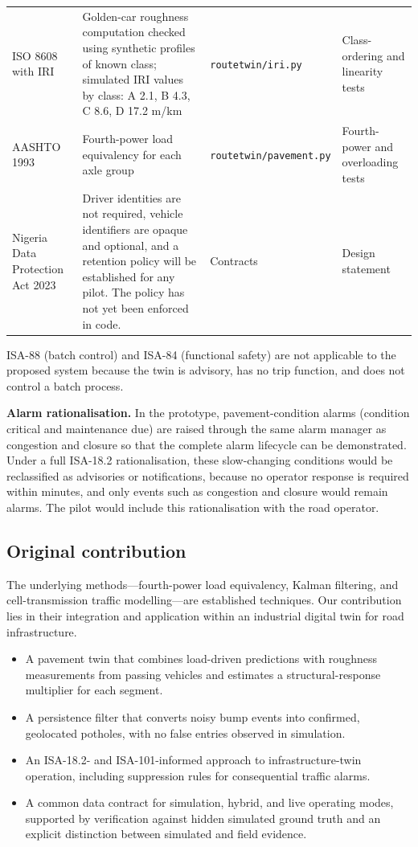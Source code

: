 \documentclass[11pt,a4paper]{article}
\newcommand{\code}[1]{\texttt{#1}}
\begin{document}
\begin{center}
\begin{longtable}{@{}L{2.4cm} L{5.0cm} L{3.7cm} L{3.7cm}@{}}
ISO 8608 \cite{iso8608} with IRI \cite{sayers,astm1926} & Golden-car roughness computation checked using synthetic profiles of known class; simulated IRI values by class: A 2.1, B 4.3, C 8.6, D 17.2 m/km & \code{routetwin/iri.py} & Class-ordering and linearity tests\\[6pt]
AASHTO 1993 \cite{aashto} & Fourth-power load equivalency for each axle group & \code{routetwin/pavement.py} & Fourth-power and overloading tests\\[6pt]
Nigeria Data Protection Act 2023 \cite{ndpa} & Driver identities are not required, vehicle identifiers are opaque and optional, and a retention policy will be established for any pilot. The policy has not yet been enforced in code. & Contracts & Design statement\\
\bottomrule
\end{longtable}
\end{center}

ISA-88 (batch control) and ISA-84 (functional safety) are not applicable to the proposed system because the twin is advisory, has no trip function, and does not control a batch process.

\textbf{Alarm rationalisation.} In the prototype, pavement-condition alarms (condition critical and maintenance due) are raised through the same alarm manager as congestion and closure so that the complete alarm lifecycle can be demonstrated. Under a full ISA-18.2 rationalisation, these slow-changing conditions would be reclassified as advisories or notifications, because no operator response is required within minutes, and only events such as congestion and closure would remain alarms. The pilot would include this rationalisation with the road operator.

\subsection{Original contribution}
The underlying methods---fourth-power load equivalency, Kalman filtering, and cell-transmission traffic modelling---are established techniques. Our contribution lies in their integration and application within an industrial digital twin for road infrastructure.

\begin{itemize}
\item A pavement twin that combines load-driven predictions with roughness measurements from passing vehicles and estimates a structural-response multiplier for each segment.
\item A persistence filter that converts noisy bump events into confirmed, geolocated potholes, with no false entries observed in simulation.
\item An ISA-18.2- and ISA-101-informed approach to infrastructure-twin operation, including suppression rules for consequential traffic alarms.
\item A common data contract for simulation, hybrid, and live operating modes, supported by verification against hidden simulated ground truth and an explicit distinction between simulated and field evidence.
\end{itemize}
\end{document}
